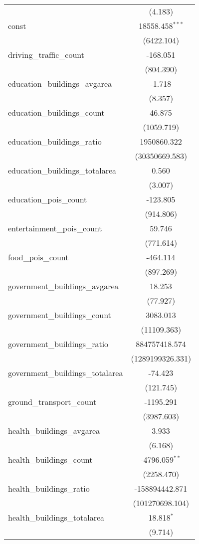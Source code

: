 \begin{table}[!htbp]
\begin{tabular}{@{\extracolsep{5pt}}lc}
  & (4.183) \\
 const & 18558.458$^{***}$ \\
  & (6422.104) \\
 driving_traffic_count & -168.051$^{}$ \\
  & (804.390) \\
 education_buildings_avgarea & -1.718$^{}$ \\
  & (8.357) \\
 education_buildings_count & 46.875$^{}$ \\
  & (1059.719) \\
 education_buildings_ratio & 1950860.322$^{}$ \\
  & (30350669.583) \\
 education_buildings_totalarea & 0.560$^{}$ \\
  & (3.007) \\
 education_pois_count & -123.805$^{}$ \\
  & (914.806) \\
 entertainment_pois_count & 59.746$^{}$ \\
  & (771.614) \\
 food_pois_count & -464.114$^{}$ \\
  & (897.269) \\
 government_buildings_avgarea & 18.253$^{}$ \\
  & (77.927) \\
 government_buildings_count & 3083.013$^{}$ \\
  & (11109.363) \\
 government_buildings_ratio & 884757418.574$^{}$ \\
  & (1289199326.331) \\
 government_buildings_totalarea & -74.423$^{}$ \\
  & (121.745) \\
 ground_transport_count & -1195.291$^{}$ \\
  & (3987.603) \\
 health_buildings_avgarea & 3.933$^{}$ \\
  & (6.168) \\
 health_buildings_count & -4796.059$^{**}$ \\
  & (2258.470) \\
 health_buildings_ratio & -158894442.871$^{}$ \\
  & (101270698.104) \\
 health_buildings_totalarea & 18.818$^{*}$ \\
  & (9.714) \\

\end{tabular}
\end{table}
